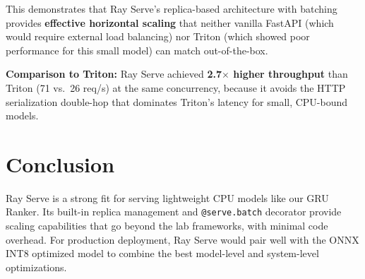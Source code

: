 \documentclass[11pt]{article}
\begin{document}
\noindent This demonstrates that Ray Serve's replica-based architecture with batching provides \textbf{effective horizontal scaling} that neither vanilla FastAPI (which would require external load balancing) nor Triton (which showed poor performance for this small model) can match out-of-the-box.

\medskip
\noindent\textbf{Comparison to Triton:} Ray Serve achieved \textbf{2.7$\times$ higher throughput} than Triton (71 vs.\ 26 req/s) at the same concurrency, because it avoids the HTTP serialization double-hop that dominates Triton's latency for small, CPU-bound models.

\section{Conclusion}

Ray Serve is a strong fit for serving lightweight CPU models like our GRU Ranker. Its built-in replica management and \texttt{@serve.batch} decorator provide scaling capabilities that go beyond the lab frameworks, with minimal code overhead. For production deployment, Ray Serve would pair well with the ONNX INT8 optimized model to combine the best model-level and system-level optimizations.
\end{document}
